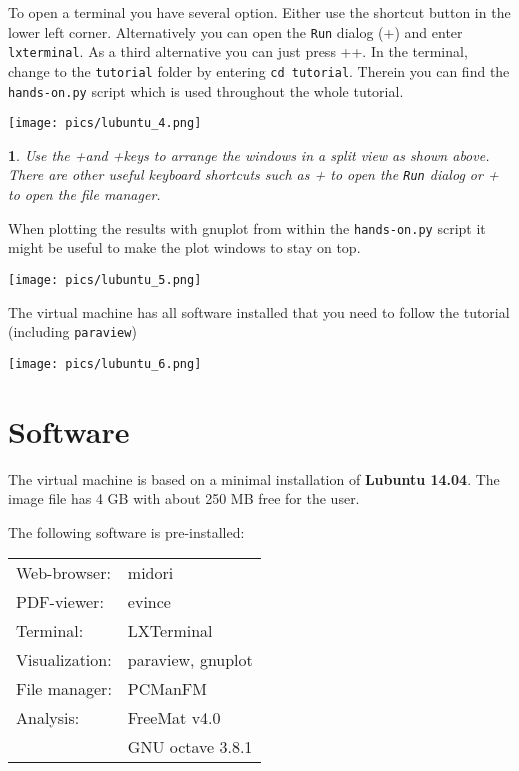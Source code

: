 \documentclass[10pt,fleqn]{book}
\newtheorem*{mycomment}{\ding{42}}
\begin{document}
To open a terminal you have several option. Either use the shortcut button in the lower left corner. Alternatively you can open the \verb|Run| dialog (\Alt+) and enter \verb|lxterminal|. As a third alternative you can just press \Ctrl+\Alt+. In the terminal, change to the \verb|tutorial| folder by entering \verb|cd tutorial|. Therein you can find the \verb|hands-on.py| script which is used throughout the whole \muelu tutorial.

\begin{center}\texttt{[image: pics/lubuntu\_4.png]} \end{center}

\begin{mycomment}
Use the +\LArrow and +\RArrow keys to arrange the windows in a split view as shown above.
There are other useful keyboard shortcuts such as + to open the \verb|Run| dialog or + to open the file manager.
\end{mycomment}

When plotting the results with gnuplot from within the \verb|hands-on.py| script it might be useful to make the plot windows to stay on top.

\begin{center}\texttt{[image: pics/lubuntu\_5.png]} \end{center}

The virtual machine has all software installed that you need to follow the tutorial (including \verb|paraview|)

\begin{center}\texttt{[image: pics/lubuntu\_6.png]} \end{center}

\section{Software}

The virtual machine is based on a minimal installation of \textbf{Lubuntu 14.04}. The image file has 4 GB with about 250 MB free for the user.

The following software is pre-installed:

\begin{tabular}{ll}
Web-browser: & midori \\
PDF-viewer:  & evince \\
Terminal:    & LXTerminal\\
Visualization: & paraview, gnuplot \\
File manager: & PCManFM \\
Analysis: & FreeMat v4.0 \\
& GNU octave 3.8.1\\
\end{tabular}
\end{document}
